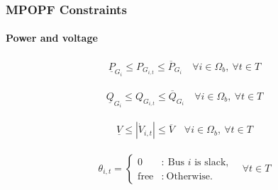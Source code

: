 \documentclass[
	11pt, %
	aspectratio=169, %
]{beamer}
\begin{document}
\begin{frame}
	\frametitle{MPOPF Constraints}
	\framesubtitle{Power and voltage} %

	\begin{align}
	\label{eq:Mcons_power_P}
		\underline{P}_{G_{i}} \leq P_{G_{i,t}} \leq \overline{P}_{G_{i}}  \quad \forall i \in \Omega_{b},\ \forall t \in T
	\end{align}

	\begin{align}
	\label{eq:Mcons_power_Q}
		\underline{Q}_{G_{i}} \leq Q_{G_{i,t}} \leq \overline{Q}_{G_{i}}  \quad \forall i \in \Omega_{b},\ \forall t \in T
	\end{align}

	\begin{align}
	\label{eq:Mcons_voltage}
		\underline{V} \leq \left|\dot{V}_{i,t} \right| \leq \overline{V}  \quad \forall i \in \Omega_{b},\ \forall t \in T
	\end{align}

	\begin{align}
	\label{eq:Mcons_slack}
		\theta_{i,t} = \left\{ \begin{array}{cl}
							0 & : \ \text{Bus } i \text{ is slack,} \\
							\text{free} & : \ \text{Otherwise.}
							\end{array} \right. \quad \forall t \in T
	\end{align}

\end{frame}

\end{document}
